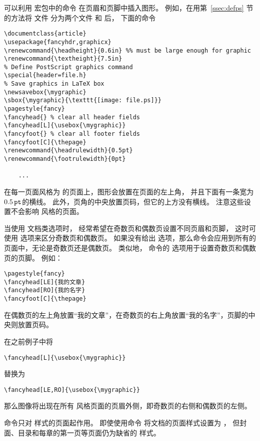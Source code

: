 可以利用  宏包中的命令
在页眉和页脚中插入图形。
例如，在用第~\ref{ssec:defps} 节的方法将  文件  分为两个文件  和  后，
下面的命令
\begin{lstlisting}
\documentclass{article}
\usepackage{fancyhdr,graphicx}
\renewcommand{\headheight}{0.6in} %% must be large enough for graphic
\renewcommand{\textheight}{7.5in}
% Define PostScript graphics command
\special{header=file.h}
% Save graphics in LaTeX box
\newsavebox{\mygraphic}
\sbox{\mygraphic}{\texttt{[image: file.ps]}}
\pagestyle{fancy}
\fancyhead{} % clear all header fields
\fancyhead[L]{\usebox{\mygraphic}}
\fancyfoot{} % clear all footer fields
\fancyfoot[C]{\thepage}
\renewcommand{\headrulewidth}{0.5pt}
\renewcommand{\footrulewidth}{0pt}

	...

\end{lstlisting}
在每一页面风格为  的页面上，图形会放置在页面的左上角，
并且下面有一条宽为 $0.5\,\mathtt{pt}$的横线。
此外，页角的中央放置页码，但它的上方没有横线。
注意这些设置不会影响  风格的页面。

当使用 \opt{[twoside]} 文档类选项时，
经常希望在奇数页和偶数页设置不同页眉和页脚，
这时可使用  选项来区分奇数页和偶数页。
如果没有给出  选项，那么命令会应用到所有的页面中，无论是奇数页还是偶数页。
类似地， 命令的  选项用于设置奇数页和偶数页的页脚。
例如：
\begin{lstlisting}
\pagestyle{fancy}
\fancyhead[LE]{我的文章}
\fancyhead[RO]{我的名字}
\fancyfoot[C]{\thepage}
\end{lstlisting}
在偶数页的左上角放置“我的文章”，在奇数页的右上角放置“我的名字”，页脚的中央则放置页码。

在之前例子中将
\begin{lstlisting}
\fancyhead[L]{\usebox{\mygraphic}}
\end{lstlisting}
替换为
\begin{lstlisting}
\fancyhead[LE,RO]{\usebox{\mygraphic}}
\end{lstlisting}
那么图像将出现在所有 风格页面的页眉外侧，即奇数页的右侧和偶数页的左侧。

 命令只对  样式的页面起作用。
即使使用命令  将文档的页面样式设置为 ，
但封面、目录和每章的第一页等页面仍为缺省的  样式。

